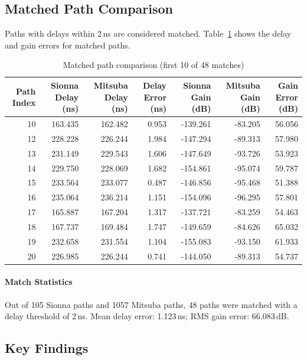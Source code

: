 \subsection{Matched Path Comparison}

Paths with delays within 2\,ns are considered matched. Table~\ref{tab:path_match} shows 
the delay and gain errors for matched paths.

\begin{table}
\caption{Matched path comparison (first 10 of 48 matches)}
\label{tab:path_match}
\begin{tabular}{rrrrrrr}
\toprule
Path Index & Sionna Delay (ns) & Mitsuba Delay (ns) & Delay Error (ns) & Sionna Gain (dB) & Mitsuba Gain (dB) & Gain Error (dB) \\
\midrule
10 & 163.435 & 162.482 & 0.953 & -139.261 & -83.205 & 56.056 \\
12 & 228.228 & 226.244 & 1.984 & -147.294 & -89.313 & 57.980 \\
13 & 231.149 & 229.543 & 1.606 & -147.649 & -93.726 & 53.923 \\
14 & 229.750 & 228.069 & 1.682 & -154.861 & -95.074 & 59.787 \\
15 & 233.564 & 233.077 & 0.487 & -146.856 & -95.468 & 51.388 \\
16 & 235.064 & 236.214 & 1.151 & -154.096 & -96.295 & 57.801 \\
17 & 165.887 & 167.204 & 1.317 & -137.721 & -83.259 & 54.463 \\
18 & 167.737 & 169.484 & 1.747 & -149.659 & -84.626 & 65.032 \\
19 & 232.658 & 231.554 & 1.104 & -155.083 & -93.150 & 61.933 \\
20 & 226.985 & 226.244 & 0.741 & -144.050 & -89.313 & 54.737 \\
\bottomrule
\end{tabular}
\end{table}



\paragraph{Match Statistics}
Out of 105 Sionna paths and 1057 Mitsuba paths, 
48 paths were matched with a delay threshold of 2\,ns.
Mean delay error: 1.123\,ns; 
RMS gain error: 66.083\,dB.


\subsection{Key Findings}

